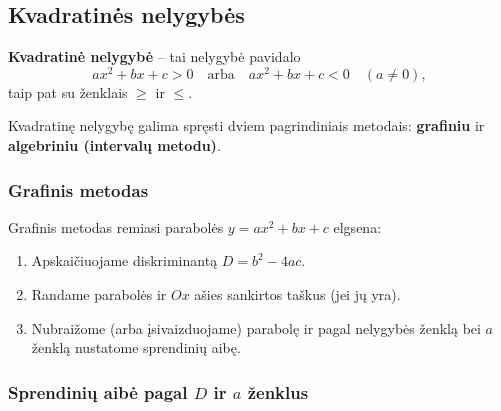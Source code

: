 \subsection{Kvadratinės nelygybės}

\begin{definition}
\textbf{Kvadratinė nelygybė} – tai nelygybė pavidalo
\[
ax^2 + bx + c > 0 \quad \text{arba} \quad ax^2 + bx + c < 0 \quad (a \neq 0),
\]
taip pat su ženklais $\geq$ ir $\leq$.
\end{definition}

Kvadratinę nelygybę galima spręsti dviem pagrindiniais metodais: \textbf{grafiniu} ir \textbf{algebriniu (intervalų metodu)}.

\subsubsection*{Grafinis metodas}

Grafinis metodas remiasi parabolės $y = ax^2 + bx + c$ elgsena:

\begin{enumerate}
    \item Apskaičiuojame diskriminantą $D = b^2 - 4ac$.
    \item Randame parabolės ir $Ox$ ašies sankirtos taškus (jei jų yra).
    \item Nubraižome (arba įsivaizduojame) parabolę ir pagal nelygybės ženklą bei $a$ ženklą nustatome sprendinių aibę.
\end{enumerate}

\subsubsection*{Sprendinių aibė pagal $D$ ir $a$ ženklus}

